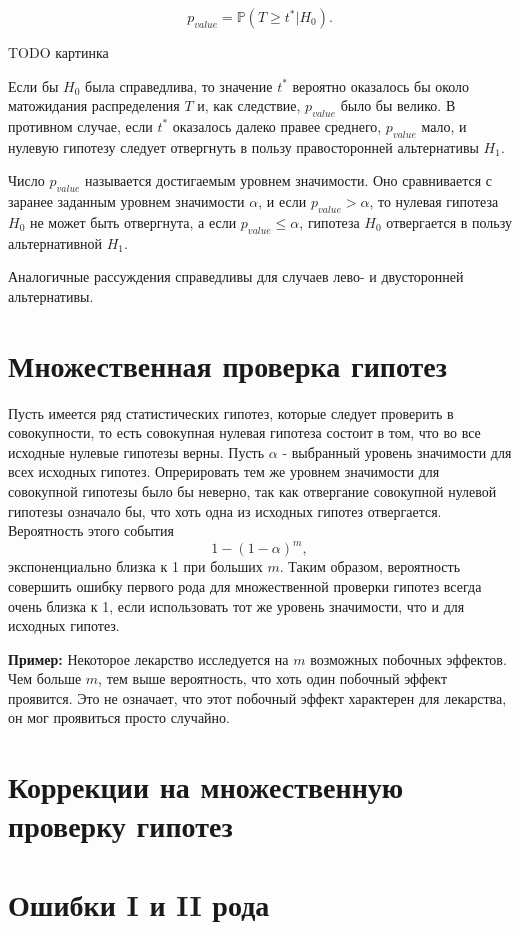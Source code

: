 $$
p_{value} = \mathbb{P}(T \geqslant t^* | H_0).
$$

TODO картинка

Если бы $H_0$ была справедлива, то значение $t^*$ вероятно оказалось бы около матожидания распределения $T$ и, как следствие, $p_{value}$ было бы велико. В противном случае, если $t^*$ оказалось далеко правее среднего, $p_{value}$ мало, и нулевую гипотезу следует отвергнуть в пользу правосторонней альтернативы $H_1$.

Число $p_{value}$ называется достигаемым уровнем значимости. Оно сравнивается с заранее заданным уровнем значимости $\alpha$, и если $p_{value} > \alpha$, то нулевая гипотеза $H_0$ не может быть отвергнута, а если $p_{value} \leqslant \alpha$, гипотеза $H_0$ отвергается в пользу альтернативной $H_1$.

Аналогичные рассуждения справедливы для случаев лево- и двусторонней альтернативы.

\section{Множественная проверка гипотез}

Пусть имеется ряд статистических гипотез, которые следует проверить в совокупности, то есть совокупная нулевая гипотеза состоит в том, что во все исходные нулевые гипотезы верны. Пусть $\alpha$ - выбранный уровень значимости для всех исходных гипотез. Опрерировать тем же уровнем значимости для совокупной гипотезы было бы неверно, так как отвергание совокупной нулевой гипотезы означало бы, что хоть одна из исходных гипотез отвергается. Вероятность этого события
$$
1 - (1 - \alpha)^m,
$$
экспоненциально близка к 1 при больших $m$. Таким образом, вероятность совершить ошибку первого рода для множественной проверки гипотез всегда очень близка к 1, если использовать тот же уровень значимости, что и для исходных гипотез.

\textbf{Пример:} Некоторое лекарство исследуется на $m$ возможных побочных эффектов. Чем больше $m$, тем выше вероятность, что хоть один побочный эффект проявится. Это не означает, что этот побочный эффект характерен для лекарства, он мог проявиться просто случайно.

\section{Коррекции на множественную проверку гипотез}

\section{Ошибки I и II рода}


